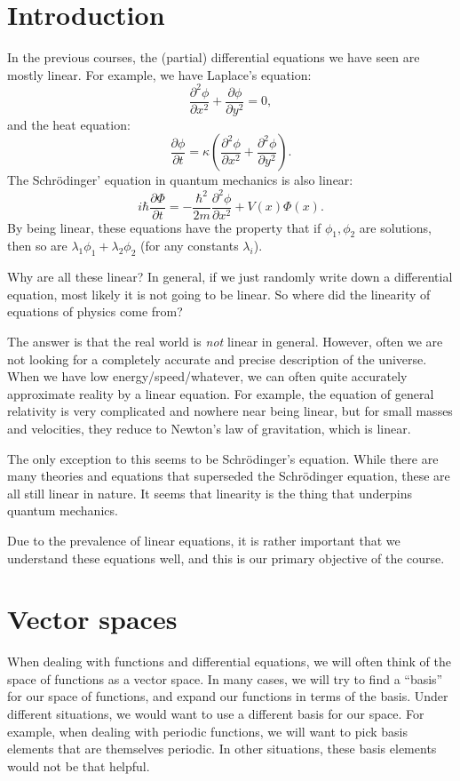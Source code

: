 \documentclass[a4paper]{article}
\begin{document}
\tableofcontents

\setcounter{section}{-1}
\section{Introduction}
In the previous courses, the (partial) differential equations we have seen are mostly linear. For example, we have Laplace's equation:
\[
  \frac{\partial^2 \phi}{\partial x^2} + \frac{\partial \phi}{\partial y^2} = 0,
\]
and the heat equation:
\[
  \frac{\partial \phi}{\partial t} = \kappa \left(\frac{\partial^2 \phi}{\partial x^2} + \frac{\partial^2 \phi }{\partial y^2}\right).
\]
The Schr\"odinger' equation in quantum mechanics is also linear:
\[
  i\hbar \frac{\partial \Phi}{\partial t}= -\frac{\hbar^2}{2m}\frac{\partial^2 \phi}{\partial x^2} + V(x) \Phi(x).
\]
By being linear, these equations have the property that if $\phi_1, \phi_2$ are solutions, then so are $\lambda_1 \phi_1 + \lambda_2 \phi_2$ (for any constants $\lambda_i$).

Why are all these linear? In general, if we just randomly write down a differential equation, most likely it is not going to be linear. So where did the linearity of equations of physics come from?

The answer is that the real world is \emph{not} linear in general. However, often we are not looking for a completely accurate and precise description of the universe. When we have low energy/speed/whatever, we can often quite accurately approximate reality by a linear equation. For example, the equation of general relativity is very complicated and nowhere near being linear, but for small masses and velocities, they reduce to Newton's law of gravitation, which is linear.

The only exception to this seems to be Schr\"odinger's equation. While there are many theories and equations that superseded the Schr\"odinger equation, these are all still linear in nature. It seems that linearity is the thing that underpins quantum mechanics.

Due to the prevalence of linear equations, it is rather important that we understand these equations well, and this is our primary objective of the course.

\section{Vector spaces}
When dealing with functions and differential equations, we will often think of the space of functions as a vector space. In many cases, we will try to find a ``basis'' for our space of functions, and expand our functions in terms of the basis. Under different situations, we would want to use a different basis for our space. For example, when dealing with periodic functions, we will want to pick basis elements that are themselves periodic. In other situations, these basis elements would not be that helpful.
\end{document}
